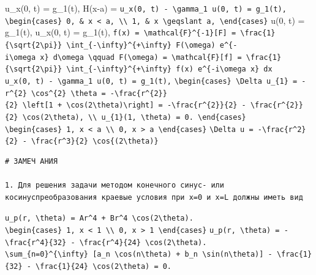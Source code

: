 \documentclass[
  ukrainian,
]{article}
\begin{document}
u\_x(0, t) = g\_1(t), H(x-a) =
\texttt{u\_x(0,\ t)\ -\ \textbackslash{}gamma\_1\ u(0,\ t)\ =\ g\_1(t),}
\texttt{\textbackslash{}begin\{cases\}\ 0,\ \&\ x\ \textless{}\ a,\ \textbackslash{}\textbackslash{}\ 1,\ \&\ x\ \textbackslash{}geqslant\ a,\ \textbackslash{}end\{cases\}}
u(0, t) = g\_1(t), u\_x(0, t) = g\_1(t),
\texttt{f(x)\ =\ \textbackslash{}mathcal\{F\}\^{}\{-1\}{[}F{]}\ =\ \textbackslash{}frac\{1\}\{\textbackslash{}sqrt\{2\textbackslash{}pi\}\}\ \textbackslash{}int\_\{-\textbackslash{}infty\}\^{}\{+\textbackslash{}infty\}\ F(\textbackslash{}omega)\ e\^{}\{-i\textbackslash{}omega\ x\}\ d\textbackslash{}omega\ \textbackslash{}qquad\ F(\textbackslash{}omega)\ =\ \textbackslash{}mathcal\{F\}{[}f{]}\ =\ \textbackslash{}frac\{1\}\{\textbackslash{}sqrt\{2\textbackslash{}pi\}\}\ \textbackslash{}int\_\{-\textbackslash{}infty\}\^{}\{+\textbackslash{}infty\}\ f(x)\ e\^{}\{-i\textbackslash{}omega\ x\}\ dx}
\texttt{u\_x(0,\ t)\ -\ \textbackslash{}gamma\_1\ u(0,\ t)\ =\ g\_1(t),}
\texttt{\textbackslash{}begin\{cases\}\ \textbackslash{}Delta\ u\_\{1\}\ =\ -r\^{}\{2\}\ \textbackslash{}cos\^{}\{2\}\ \textbackslash{}theta\ =\ -\textbackslash{}frac\{r\^{}\{2\}\}\{2\}\ \textbackslash{}left{[}1\ +\ \textbackslash{}cos(2\textbackslash{}theta)\textbackslash{}right{]}\ =\ -\textbackslash{}frac\{r\^{}\{2\}\}\{2\}\ -\ \textbackslash{}frac\{r\^{}\{2\}\}\{2\}\ \textbackslash{}cos(2\textbackslash{}theta),\ \textbackslash{}\textbackslash{}\ u\_\{1\}(1,\ \textbackslash{}theta)\ =\ 0.\ \textbackslash{}end\{cases\}}
\texttt{\textbackslash{}begin\{cases\}\ 1,\ \textbar{}x\textbar{}\ \textless{}\ a\ \textbackslash{}\textbackslash{}\ 0,\ \textbar{}x\textbar{}\ \textgreater{}\ a\ \textbackslash{}end\{cases\}}
\texttt{\textbackslash{}Delta\ u\ =\ -\textbackslash{}frac\{r\^{}2\}\{2\}\ -\ \textbackslash{}frac\{r\^{}3\}\{2\}\ \textbackslash{}cos\{(2\textbackslash{}theta)\}}

\begin{verbatim}
# ЗАМЕЧ АНИЯ

1. Для решения задачи методом конечного синус- или косинуспреобразования краевые условия при x=0 и x=L должны иметь вид
\end{verbatim}

\texttt{u\_p(r,\ \textbackslash{}theta)\ =\ Ar\^{}4\ +\ Br\^{}4\ \textbackslash{}cos(2\textbackslash{}theta).}
\texttt{\textbackslash{}begin\{cases\}\ 1,\ \textbar{}x\textbar{}\ \textless{}\ 1\ \textbackslash{}\textbackslash{}\ 0,\ \textbar{}x\textbar{}\ \textgreater{}\ 1\ \textbackslash{}end\{cases\}}
\texttt{u\_p(r,\ \textbackslash{}theta)\ =\ -\textbackslash{}frac\{r\^{}4\}\{32\}\ -\ \textbackslash{}frac\{r\^{}4\}\{24\}\ \textbackslash{}cos(2\textbackslash{}theta).}
\texttt{\textbackslash{}sum\_\{n=0\}\^{}\{\textbackslash{}infty\}\ {[}a\_n\ \textbackslash{}cos(n\textbackslash{}theta)\ +\ b\_n\ \textbackslash{}sin(n\textbackslash{}theta){]}\ -\ \textbackslash{}frac\{1\}\{32\}\ -\ \textbackslash{}frac\{1\}\{24\}\ \textbackslash{}cos(2\textbackslash{}theta)\ =\ 0.}
\end{document}
